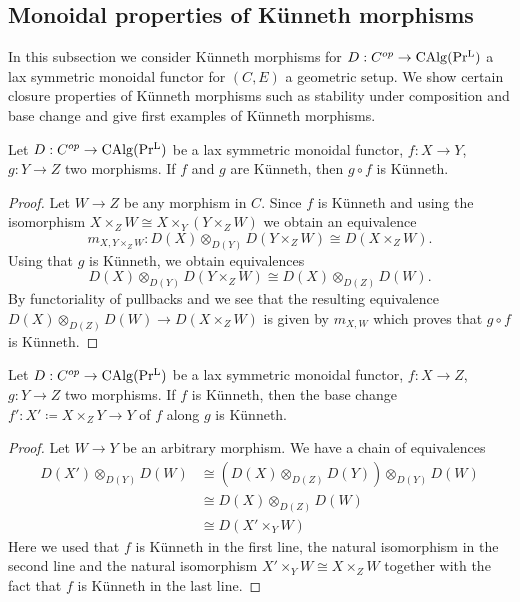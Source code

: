 \subsection{Monoidal properties of Künneth morphisms}\label{monoidal properties of Künneth}
In this subsection we consider Künneth morphisms for $D: C^{op} \to \operatorname{CAlg}(\operatorname{Pr^{L}})$  a lax symmetric monoidal functor for $(C,E)$ a geometric setup. We show certain closure properties of Künneth morphisms such as stability under composition and base change and give first examples of Künneth morphisms. 

\begin{lemma}\label{dualisbe stable under compposition}
Let $D: C^{op} \to \operatorname{CAlg}(\operatorname{Pr^{L}})$ be a lax symmetric monoidal functor, $f: X \to Y$, $g: Y \to Z$ two morphisms. If $f$ and $g$ are Künneth, then $g\circ f$ is Künneth. 
\end{lemma}
\begin{proof}
 Let $W \to Z$ be any morphism in $C$. Since $f$ is Künneth and using the isomorphism $X \times_Z W \cong X \times_Y (Y\times_Z W)$ we obtain an equivalence 
\[
m_{X,Y\times_ZW}: D(X) \otimes_{D(Y)}D(Y\times_Z W)\cong D(X\times_ZW ).
\]
Using that $g$ is Künneth, we obtain equivalences 
\[
D(X) \otimes_{D(Y)}D(Y\times_Z W)\cong D(X)\otimes_{D(Z)}D(W).
\]
By functoriality of pullbacks and  we see that the resulting equivalence $D(X)\otimes_{D(Z)}D(W) \to D(X\times_Z W)$ is given by $m_{X,W}$ which proves that $g\circ f$ is Künneth. 
\end{proof}
\begin{lemma}\label{dualisable stable under bc}
Let $D: C^{op} \to \operatorname{CAlg}(\operatorname{Pr^{L}})$ be a lax symmetric monoidal functor, $f: X \to Z$, $g: Y \to Z$ two morphisms. If $f$ is Künneth, then the base change $f' : X' \coloneq X\times_Z Y \to Y$ of $f$ along $g$ is Künneth.
\end{lemma}
\begin{proof}
 Let $W \to Y$ be an arbitrary morphism. We have a chain of equivalences 
 \begin{align*}
     D(X') \otimes_{D(Y)}D(W) & \cong (D(X)\otimes_{D(Z)}D(Y) )\otimes_{D(Y)}D(W) \\
     & \cong D(X) \otimes_{D(Z)}D(W) \\
     & \cong D(X' \times_Y W)
 \end{align*}
 Here we used that $f$ is Künneth in the first line, the natural isomorphism in the second line and the natural isomorphism $X' \times_Y W \cong X\times_Z W$ together with the fact that $f$ is Künneth in the last line.
\end{proof}

